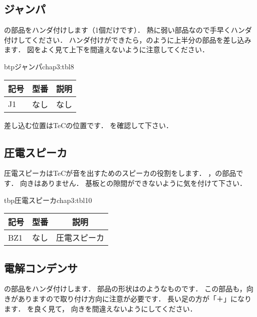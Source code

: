 
\subsection{ジャンパ}
の部品をハンダ付けします（1個だけです）．
熱に弱い部品なので手早くハンダ付けしてください．
ハンダ付けができたら，のように上半分の部品を差し込みます．
図をよく見て上下を間違えないように注意してください．

\begin{mytable}{btp}{ジャンパ}{chap3:tbl8}
  {\small\begin{tabular}{l|l|l}
    \hline
    \hline
    \multicolumn{1}{c|}{記号} &
    \multicolumn{1}{c|}{型番} &
    \multicolumn{1}{c}{説明} \\
    \hline
    J1 & なし &  なし \\
  \end{tabular}}
\end{mytable}

差し込む位置はTeCの位置です．
を確認して下さい．


\subsection{圧電スピーカ}
圧電スピーカはTeCが音を出すためのスピーカの役割をします．
，の部品です．
向きはありません．
基板との隙間ができないように気を付けて下さい．

\begin{mytable}{tbp}{圧電スピーカ}{chap3:tbl10}
  {\small\begin{tabular}{l|l|l}
    \hline
    \hline
    \multicolumn{1}{c|}{記号} &
    \multicolumn{1}{c|}{型番} &
    \multicolumn{1}{c}{説明} \\
    \hline
    BZ1 & なし & 圧電スピーカ \\
  \end{tabular}}
\end{mytable}


\subsection{電解コンデンサ}
の部品をハンダ付けします．
部品の形状はのようなものです．
この部品も，向きがありますので取り付け方向に注意が必要です．
長い足の方が「＋」になります．
を良く見て，
向きを間違えないようにしてください．

